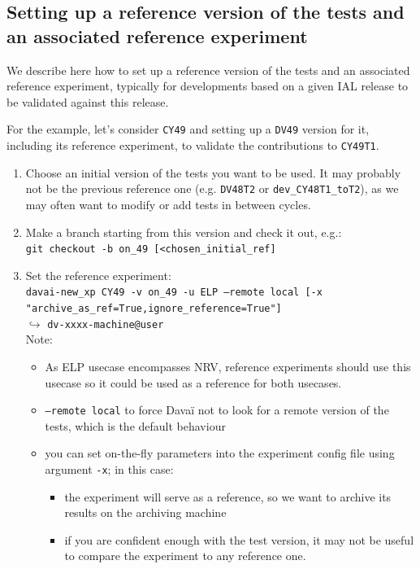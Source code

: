 \documentclass[a4paper,10pt,twoside]{article}
\begin{document}
\begin{appendix}
\subsection{Setting up a reference version of the tests and an associated reference experiment\label{sect:set_a_ref_tests_version}}
We describe here how to set up a reference version of the tests and an associated reference experiment, typically for developments based on a given IAL release to be validated against this release.

For the example, let's consider \texttt{CY49} and setting up a \texttt{DV49} version for it, including its reference experiment, to validate the contributions to \texttt{CY49T1}.
\begin{enumerate}[label=\arabic*),start=0]
 \item Choose an initial version of the tests you want to be used. It may probably not be the previous reference one (e.g. \texttt{DV48T2} or \texttt{dev\_CY48T1\_toT2}), as we may often want to modify or add tests in between cycles.
 \item Make a branch starting from this version and check it out, e.g.:\\
 \texttt{git checkout -b on\_49 [<chosen\_initial\_ref]}
 \item Set the reference experiment:\\
 \texttt{davai-new\_xp CY49 -v on\_49 -u ELP --remote local [-x "archive\_as\_ref=True,ignore\_reference=True"]}\\
 $\hookrightarrow$ \texttt{dv-xxxx-machine@user}\\
 Note:
 \begin{itemize}
  \item As ELP usecase encompasses NRV, reference experiments should use this usecase so it could be used as a reference for both usecases.
  \item \texttt{--remote local} to force Davaï not to look for a  remote version of the tests, which is the default behaviour
  \item you can set on-the-fly parameters into the experiment config file using argument \texttt{-x}; in this case:
  \begin{itemize}
   \item the experiment will serve as a reference, so we want to archive its results on the archiving machine
   \item if you are confident enough with the test version, it may not be useful to compare the experiment to any reference one.
  \end{itemize}

\end{itemize}
\end{enumerate}
\end{appendix}
\end{document}
